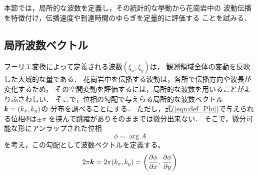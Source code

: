 ﻿本節では，局所的な波数を定義し，その統計的な挙動から花崗岩中の
波動伝播を特徴付け，伝播速度や到達時間のゆらぎを定量的に評価する
ことを試みる．
\subsection{局所波数ベクトル}
フーリエ変換によって定義される波数$(\xi_x,\xi_y)$は，
観測領域全体の変動を反映した大域的な量である．
花崗岩中を伝播する波動は，各所で伝播方向や波長が変化するため，
その空間変動を評価するには，局所的な波数を用いることがよりふさわしい．
そこで，位相の勾配で与えらる局所的な波数ベクトル$\mbox{\boldmath{$k$}}=(k_x,k_y)$の
分布を調べることにする．
ただし，式(\ref{eqn:def_Phi})で与えられる位相$\Phi$は$\pm \pi$
を挟んで跳躍がありそのままでは微分出来ない．
そこで，微分可能な形にアンラップされた位相
\begin{equation}
	\phi=\arg A
	\label{eqn:}
\end{equation}
を考え，この勾配として波数ベクトルを定義する。
\begin{equation}
	2\pi \fat{k}= 
	2\pi (k_x,k_y)=
	\left(
		\frac{\partial \phi}{\partial x}
		, \, 
		\frac{\partial \phi}{\partial y} 
	\right)
	\label{eqn:}
\end{equation}
